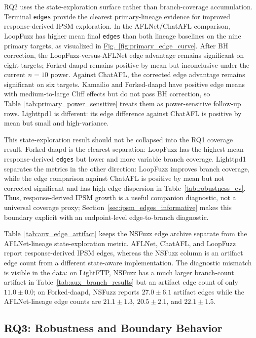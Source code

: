 \documentclass[final,5p,times,number]{elsarticle}
\newcommand{\figref}[1]{\hyperref[#1]{Fig.~\ref*{#1}}}
\begin{document}
RQ2 uses the state-exploration surface rather than branch-coverage accumulation. Terminal \texttt{edges} provide the clearest primary-lineage evidence for improved response-derived IPSM exploration. In the AFLNet/ChatAFL comparison, LoopFuzz has higher mean final \texttt{edges} than both lineage baselines on the nine primary targets, as visualized in \figref{fig:primary_edge_curve}. After BH correction, the LoopFuzz-versus-AFLNet edge advantage remains significant on eight targets; Forked-daapd remains positive by mean but inconclusive under the current $n=10$ power. Against ChatAFL, the corrected edge advantage remains significant on six targets. Kamailio and Forked-daapd have positive edge means with medium-to-large Cliff effects but do not pass BH correction, so Table~\ref{tab:primary_power_sensitive} treats them as power-sensitive follow-up rows. Lighttpd1 is different: its edge difference against ChatAFL is positive by mean but small and high-variance.

This state-exploration result should not be collapsed into the RQ1 coverage result. Forked-daapd is the clearest separation: LoopFuzz has the highest mean response-derived \texttt{edges} but lower and more variable branch coverage. Lighttpd1 separates the metrics in the other direction: LoopFuzz improves branch coverage, while the edge comparison against ChatAFL is positive by mean but not corrected-significant and has high edge dispersion in Table~\ref{tab:robustness_cv}. Thus, response-derived IPSM growth is a useful companion diagnostic, not a universal coverage proxy; Section~\ref{sec:ipsm_edges_informative} makes this boundary explicit with an endpoint-level edge-to-branch diagnostic.

Table~\ref{tab:aux_edge_artifact} keeps the NSFuzz edge archive separate from the AFLNet-lineage state-exploration metric. AFLNet, ChatAFL, and LoopFuzz report response-derived IPSM edges, whereas the NSFuzz column is an artifact edge count from a different state-aware implementation. The diagnostic mismatch is visible in the data: on LightFTP, NSFuzz has a much larger branch-count artifact in Table~\ref{tab:aux_branch_results} but an artifact edge count of only $11.0{\pm}0.0$; on Forked-daapd, NSFuzz reports $27.0{\pm}6.1$ artifact edges while the AFLNet-lineage edge counts are $21.1{\pm}1.3$, $20.5{\pm}2.1$, and $22.1{\pm}1.5$.

\subsection{RQ3: Robustness and Boundary Behavior}
\end{document}
